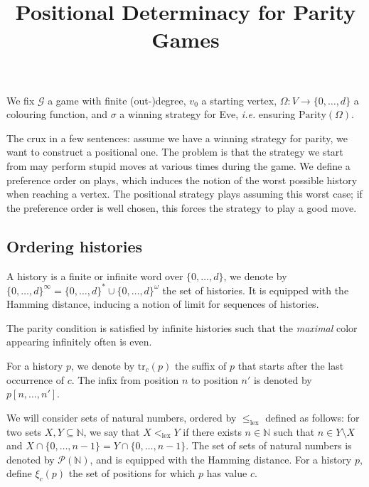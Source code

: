\documentclass[11pt]{llncs}
\title{Positional Determinacy for Parity Games}
\newcommand{\set}[1]{\{ #1 \}}
\newcommand{\N}{\mathbb{N}}
\newcommand{\G}{\mathcal{G}}
\newcommand{\Parity}{\mathrm{Parity}}
\newcommand{\colors}{\set{0,\ldots,d}}
\newcommand{\lex}{\le_{\mathrm{lex}}}
\newcommand{\lexstrict}{<_{\mathrm{lex}}}
\newcommand{\tr}{\mathrm{tr}}
\renewcommand{\P}{\mathcal{P}}
\begin{document}
\maketitle

We fix $\G$ a game with finite (out-)degree, $v_0$ a starting vertex, $\Omega : V \to \colors$ a colouring function,
and $\sigma$ a winning strategy for Eve, \textit{i.e.} ensuring $\Parity(\Omega)$.

The crux in a few sentences: assume we have a winning strategy for parity, we want to construct a positional one. The problem is that the strategy we start from may perform stupid moves at various times during the game. We define a preference order on plays, which induces the notion of the worst possible history when reaching a vertex. The positional strategy plays assuming this worst case; if the preference order is well chosen, this forces the strategy to play a good move.
\subsection{Ordering histories}

A history is a finite or infinite word over $\colors$,
we denote by $\colors^\infty = \colors^* \cup \colors^\omega$ the set of histories.
It is equipped with the Hamming distance, inducing a notion of limit for sequences of histories.

The parity condition is satisfied by infinite histories such that the \textit{maximal} color appearing infinitely
often is even.

For a history $p$, we denote by $\tr_c(p)$ the suffix of $p$ that starts after the last occurrence of $c$.
The infix from position $n$ to position $n'$ is denoted by $p[n,\ldots,n']$.

We will consider sets of natural numbers, ordered by $\lex$ defined as follows:
for two sets $X,Y \subseteq \N$, 
we say that $X \lexstrict Y$ if there exists $n \in \N$ such that
$n \in Y \setminus X$ and $X \cap \set{0,\ldots,n-1} = Y \cap \set{0,\ldots,n-1}$.
The set of sets of natural numbers is denoted by $\P(\N)$,
and is equipped with the Hamming distance.
For a history $p$, define $\xi_c(p)$ the set of positions for which $p$ has value $c$.
\end{document}
